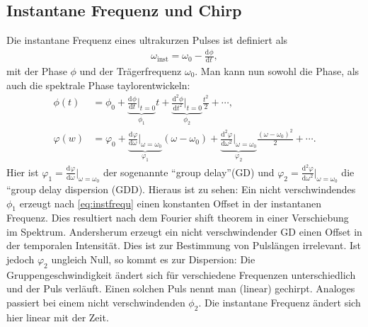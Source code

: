 \documentclass[twoside,        %
               BCOR12mm,       %
               english,ngerman, %
               fleqn,headsepline=false,footsepline=false
              ]{Vorlage/MFPREPORT}
\renewcommand{\d}{\ensuremath{\mathrm{d}}} %
\newcommand{\diff}[3][]{\ensuremath{\frac{\d^{#1}#2}{\d#3^{#1}}}} %
\begin{document}
\subsection{Instantane Frequenz und Chirp}
Die instantane Frequenz eines ultrakurzen Pulses ist definiert als
\cite{trebinolec} 
\begin{align}
    \omega_{\text{inst}}=\omega_0-\diff{\phi}{t},
    \label{eq:instfrequ}
\end{align}
mit der Phase $\phi$ und der Trägerfrequenz $\omega_0$. Man kann nun sowohl die Phase, als auch die spektrale Phase taylorentwickeln: 
\begin{align}
    \phi(t)&=\phi_0+\underbrace{\diff{\phi}{t}|_{t=0}}_{\phi_1}t+\underbrace{\diff[2]{\phi}{t}|_{t=0}}_{\phi_2}\frac{t^2}{2}+\cdots,\\
    \varphi(w)&=\varphi_0+\underbrace{\diff{\varphi}{\omega}|_{\omega=\omega_0}}_{\varphi_1}(\omega-\omega_0)+\underbrace{\diff[2]{\varphi}{\omega}|_{\omega=\omega_0}}_{\varphi_2}\frac{(\omega-\omega_0)^2}{2}+\cdots.
    \label{eq:taylor}
\end{align}
Hier ist $\varphi_1=\diff{\varphi}{\omega}|_{\omega=\omega_0}$ der sogenannte
``group delay''(GD) und
$\varphi_2=\diff[2]{\varphi}{\omega}|_{\omega=\omega_0}$ die ``group delay
dispersion (GDD). Hieraus ist zu sehen: Ein nicht verschwindendes $\phi_1$
erzeugt nach \cref{eq:instfrequ} einen konstanten Offset in der instantanen
Frequenz. Dies resultiert nach dem Fourier shift theorem \cite{Diels2006} in einer
Verschiebung im Spektrum. Andersherum erzeugt ein nicht verschwindender GD
einen Offset in der temporalen Intensität. Dies ist zur Bestimmung von
Pulslängen irrelevant. Ist jedoch $\varphi_2$ ungleich Null, so kommt es zur
Dispersion: Die Gruppengeschwindigkeit ändert sich für verschiedene Frequenzen
unterschiedlich und der Puls verläuft. Einen solchen Puls nennt man (linear) gechirpt. Analoges passiert bei einem nicht verschwindenden $\phi_2$. Die instantane Frequenz ändert sich hier linear mit der Zeit.
\end{document}
